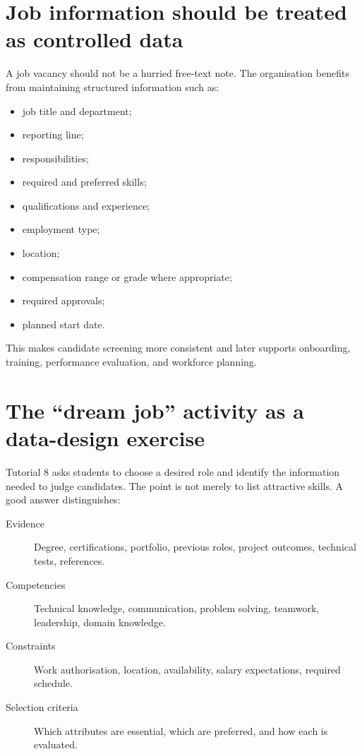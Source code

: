 \section{Job information should be treated as controlled data}

A job vacancy should not be a hurried free-text note. The organisation benefits from maintaining structured information such as:

\begin{itemize}
  \item job title and department;
  \item reporting line;
  \item responsibilities;
  \item required and preferred skills;
  \item qualifications and experience;
  \item employment type;
  \item location;
  \item compensation range or grade where appropriate;
  \item required approvals;
  \item planned start date.
\end{itemize}

This makes candidate screening more consistent and later supports onboarding, training, performance evaluation, and workforce planning.

\section{The ``dream job'' activity as a data-design exercise}

Tutorial 8 asks students to choose a desired role and identify the information needed to judge candidates. The point is not merely to list attractive skills. A good answer distinguishes:

\begin{description}
  \item[Evidence] Degree, certifications, portfolio, previous roles, project outcomes, technical tests, references.
  \item[Competencies] Technical knowledge, communication, problem solving, teamwork, leadership, domain knowledge.
  \item[Constraints] Work authorisation, location, availability, salary expectations, required schedule.
  \item[Selection criteria] Which attributes are essential, which are preferred, and how each is evaluated.
\end{description}

